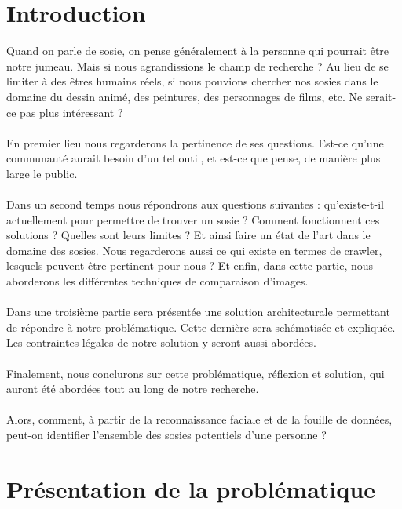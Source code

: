 \documentclass[a4paper,12pt]{article}
\begin{document}
\newpage
\section*{Introduction}
Quand on parle de sosie, on pense généralement à la personne qui pourrait être notre jumeau. Mais si nous agrandissions le champ de recherche ? Au lieu de se limiter à des êtres humains réels, si nous pouvions chercher nos sosies dans le domaine du dessin animé, des peintures, des personnages de films, etc. Ne serait-ce pas plus intéressant ? 
\\\\
En premier lieu nous regarderons la pertinence de ses questions. Est-ce qu'une communauté aurait besoin d'un tel outil, et est-ce que pense, de manière plus large le public. 
\\\\
Dans un second temps nous répondrons aux questions suivantes : qu'existe-t-il actuellement pour permettre de trouver un sosie ? Comment fonctionnent ces solutions ? Quelles sont leurs limites ? Et ainsi faire un état de l'art dans le domaine des sosies. Nous regarderons aussi ce qui existe en termes de crawler, lesquels peuvent être pertinent pour nous ? Et enfin, dans cette partie, nous aborderons les différentes techniques de comparaison d'images. 
\\\\
Dans une troisième partie sera présentée une solution architecturale permettant de répondre à notre problématique. Cette dernière sera schématisée et expliquée. Les contraintes légales de notre solution y seront aussi abordées. 
\\\\
Finalement, nous conclurons sur cette problématique, réflexion et solution, qui auront été abordées tout au long de notre recherche. 
\\\\
Alors, comment, à partir de la reconnaissance faciale et de la fouille de données, peut-on identifier l’ensemble des sosies potentiels d’une personne ?


\newpage
\section{Présentation de la problématique}
\end{document}
